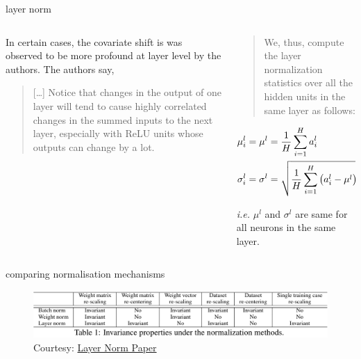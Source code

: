 \documentclass[aspectratio=169,xcolor={dvipsnames,svgnames}]{beamer}
\begin{document}
\begin{frame}[label={sec:org99a409e}]{layer norm}
\begin{columns}
\begin{column}{0.45\columnwidth}
In certain cases, the covariate shift is was observed
to be more profound at layer level by the authors.  The
authors say,

\begin{quote}
[\ldots] Notice that changes in the output of one layer
will tend to cause highly correlated changes in the
summed inputs to the next layer, especially with ReLU
units whose outputs can change by a lot.
\end{quote}
\end{column}
\begin{column}{0.55\columnwidth}
\begin{quote}
We, thus, compute the layer normalization statistics
over \alert{all the hidden units} in the same layer as
follows:
\end{quote}

\begin{align}
  \notag
  \mu_i^l = \mu^l
  &= \frac1H\sum_{i=1}^{H}a_i^l \\
  \notag
  \sigma_i^l = \sigma^l
  &= \sqrt{ \frac1H \sum_{i=1}^H \left( a_i^l - \mu^l
    \right)^{2}}
\end{align}

\emph{i.e.} \(\mu^{l}\) and \(\sigma^{l}\) are same for all
neurons in the same layer.
\end{column}
\end{columns}
\end{frame}

\begin{frame}[label={sec:org2d30b25}]{comparing normalisation mechanisms}
\begin{figure}[htbp]
\centering
\includegraphics[width=.9\linewidth]{org-download-images/Appendix/2024-08-20_03-20-24_screenshot.png}
\caption{Courtesy: \href{http://arxiv.org/abs/1607.06450}{Layer Norm Paper}}
\end{figure}
\end{frame}
\end{document}
